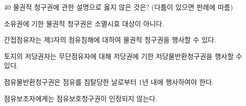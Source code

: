 \begin{question}{40}
물권적 청구권에 관한 설명으로 옳지 않은 것은? (다툼이 있으면 판례에 따름)
\begin{choices}
  \item 소유권에 기한 물권적 청구권은 소멸시효 대상이 아니다.
  \item 간접점유자는 제3자의 점유침해에 대하여 물권적 청구권을 행사할 수 있다.
  \item 토지의 저당권자는 무단점유자에 대해 저당권에 기한 저당물반환청구권을 행사할 수 있다.
  \item 점유물반환청구권은 점유를 침탈당한 날로부터 1년 내에 행사하여야 한다.
  \item 점유보조자에게는 점유보호청구권이 인정되지 않는다.
\end{choices}
\end{question}

